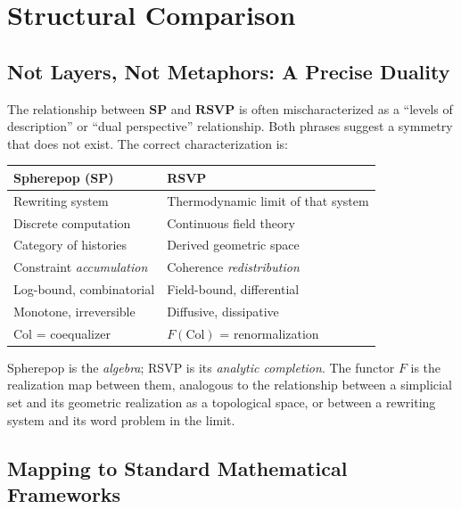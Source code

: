 \documentclass[12pt, a4paper]{article}
\theoremstyle{definition}
\theoremstyle{remark}
\newcommand{\SP}{\mathbf{SP}}
\newcommand{\RSVP}{\mathbf{RSVP}}
\newcommand{\Collapse}{\mathrm{Col}}
\begin{document}
\section{Structural Comparison}
\label{sec:structure}

\subsection{Not Layers, Not Metaphors: A Precise Duality}

The relationship between $\SP$ and $\RSVP$ is often mischaracterized as a
``levels of description'' or ``dual perspective'' relationship. Both phrases suggest a
symmetry that does not exist. The correct characterization is:

\begin{center}
\renewcommand{\arraystretch}{1.5}
\begin{tabular}{ll}
\toprule
\textbf{Spherepop} ($\SP$) & \textbf{RSVP} \\
\midrule
Rewriting system & Thermodynamic limit of that system \\
Discrete computation & Continuous field theory \\
Category of histories & Derived geometric space \\
Constraint \emph{accumulation} & Coherence \emph{redistribution} \\
Log-bound, combinatorial & Field-bound, differential \\
Monotone, irreversible & Diffusive, dissipative \\
$\Collapse$ = coequalizer & $F(\Collapse)$ = renormalization \\
\bottomrule
\end{tabular}
\end{center}

Spherepop is the \emph{algebra}; RSVP is its \emph{analytic completion}. The functor
$F$ is the realization map between them, analogous to the relationship between a
simplicial set and its geometric realization as a topological space, or between a
rewriting system and its word problem in the limit.

\subsection{Mapping to Standard Mathematical Frameworks}
\end{document}
